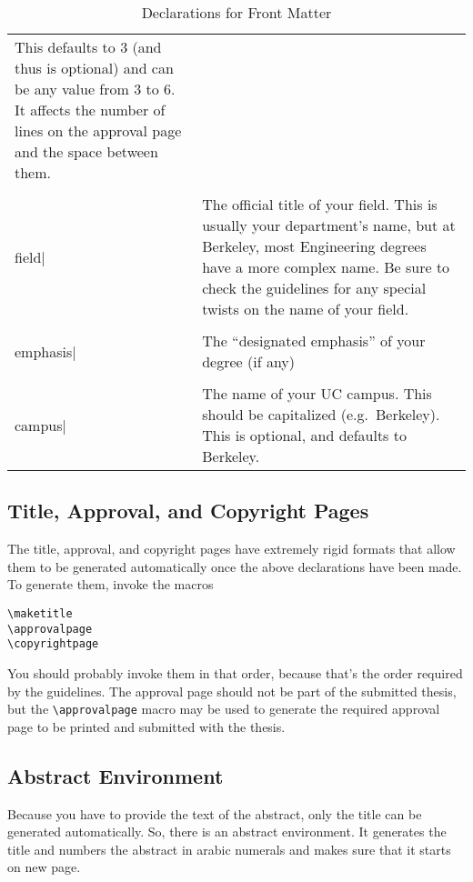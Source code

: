 \documentclass[11pt]{article}
\begin{document}
\begin{table}
\begin{tabularx}{.9\textwidth}{lX}
  This defaults to 3 (and thus is optional) and can be any value from
  3 to 6.  It affects the number of lines on the approval
  page and the space between them. \\
\lstinline|\\field| & The official title of your field.  This is usually
  your department's name, but at Berkeley, most
  Engineering degrees have a more complex name.
  Be sure to check the guidelines for any special
  twists on the name of your field. \\
\lstinline|\\emphasis| & The ``designated emphasis'' of your degree (if any) \\
\lstinline|\\campus| & The name of your UC campus.  This should be capitalized
  (e.g.~Berkeley).  This is optional, and defaults to Berkeley. \\
\bottomrule
\end{tabularx}
\caption{Declarations for Front Matter}\label{decls}
\end{table}

\subsection{Title, Approval, and Copyright Pages}

The title, approval, and copyright pages have extremely rigid formats
that allow them to be generated automatically once the above
declarations have been made.  To generate them, invoke the macros
\begin{lstlisting}
\maketitle
\approvalpage
\copyrightpage
\end{lstlisting}

You should probably invoke them in that order, because that's the
order required by the guidelines.  The approval page should not be part
of the submitted thesis, but the \verb|\approvalpage| macro may be used to
generate the required approval page to be printed and submitted with the
thesis.

\subsection{Abstract Environment}

Because you have to provide the text of the abstract, only the title
can be generated automatically.  So, there is an abstract environment.
It generates the title and numbers the abstract in arabic numerals and
makes sure that it starts on new page.
\end{document}
